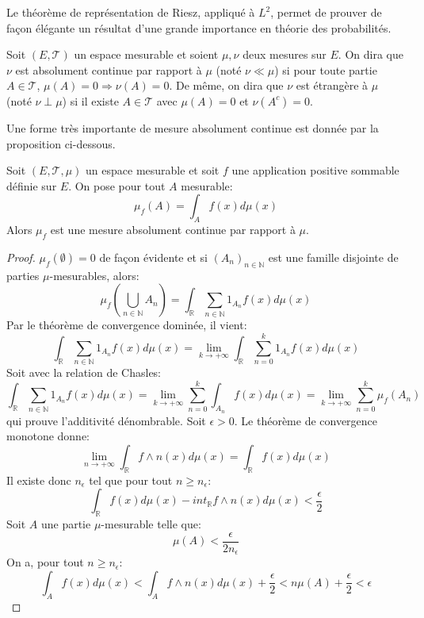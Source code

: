 Le théorème de représentation de Riesz, appliqué à $L^2$, permet de prouver de
façon élégante un résultat d'une grande importance en théorie des probabilités.
\begin{defn}
Soit $(E, \mathcal{T})$ un espace mesurable et soient $\mu, \nu$ deux
mesures sur $E$. On dira que $\nu$ est absolument continue par rapport
à $\mu$ (noté $\nu \ll \mu$) si pour toute partie $A \in \mathcal{T}$,
$\mu(A) = 0 \Rightarrow \nu(A) = 0$. De même, on dira que $\nu$ est
étrangère à $\mu$ (noté $\nu \perp \mu$) si il existe $A \in
\mathcal{T}$ avec $\mu(A) = 0$ et $\nu(A^c) = 0$.
\end{defn}
Une forme très importante de mesure absolument continue est donnée par la proposition ci-dessous.
\begin{mandatory}
\begin{prop}
Soit $(E, \mathcal{T}, \mu)$ un espace mesurable
et soit  $f$ une application positive sommable définie sur $E$. On pose pour
tout $A$ mesurable:
\[
\mu_f(A) = \int_{A} f(x) d \mu(x)
\]
Alors $\mu_f$ est une mesure absolument continue par rapport à $\mu$.
\end{prop}
\end{mandatory}
\begin{proof}
$\mu_f(\emptyset)=0$ de façon évidente et si $(A_n)_{n \in \mathbb{N}}$ est une
famille disjointe de parties $\mu$-mesurables, alors:
\[
\mu_f\left(\bigcup_{n \in \mathbb{N}} A_n \right) = \int_{\mathbb{R}} \sum_{n
\in \mathbb{N}} 1_{A_n} f(x) d \mu(x)
\]
Par le théorème de convergence dominée, il vient:
\[
 \int_{\mathbb{R}} \sum_{n
\in \mathbb{N}} 1_{A_n} f(x) d \mu(x) = \lim_{k \to +\infty}
\int_{\mathbb{R}} \sum_{n=0}^k 1_{A_n} f(x) d \mu(x)
\]
Soit avec la relation de Chasles:
\[
\int_{\mathbb{R}} \sum_{n
\in \mathbb{N}} 1_{A_n} f(x) d \mu(x) = \lim_{k \to +\infty}
\sum_{n=0}^k \int_{A_n} f(x) d \mu(x) = \lim_{k \to +\infty}
\sum_{n=0}^k \mu_f(A_n)
\]
qui prouve l'additivité dénombrable.
Soit $\epsilon > 0$. Le théorème de convergence monotone donne:
\[
\lim_{n \to +\infty} \int_{\mathbb{R}} f\wedge n(x) d \mu(x) = 
\int_{\mathbb{R}} f(x) d \mu(x)
\] 
Il existe donc $n_\epsilon$ tel que pour tout $n \geq n_{\epsilon}$:
\[
\int_{\mathbb{R}} f(x) d \mu(x) - int_{\mathbb{R}} f\wedge n(x) d \mu(x)
< \frac{\epsilon}{2}
\]
Soit $A$ une partie $\mu$-mesurable telle que:
$$\mu(A) < \frac{\epsilon}{2n_\epsilon}$$
On a, pour tout $n \geq n_{\epsilon}$:
\[
\int_{A} f(x)d \mu(x) < \int_{A} f \wedge n(x) d \mu(x) +
\frac{\epsilon}{2} < n \mu(A) + \frac{\epsilon}{2}  < \epsilon
\]
\end{proof}
